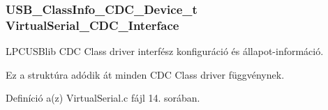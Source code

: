 \subsubsection[{Virtual\-Serial\-\_\-\-C\-D\-C\-\_\-\-Interface}]{\setlength{\rightskip}{0pt plus 5cm}U\-S\-B\-\_\-\-Class\-Info\-\_\-\-C\-D\-C\-\_\-\-Device\-\_\-t Virtual\-Serial\-\_\-\-C\-D\-C\-\_\-\-Interface}\label{tasks_8c_a6abff48bf476b7a0b5d81012d90058a6}


L\-P\-C\-U\-S\-Blib C\-D\-C Class driver interfész konfiguráció és állapot-\/információ. 

Ez a struktúra adódik át minden C\-D\-C Class driver függvénynek. 

Definíció a(z) Virtual\-Serial.\-c fájl 14. sorában.

